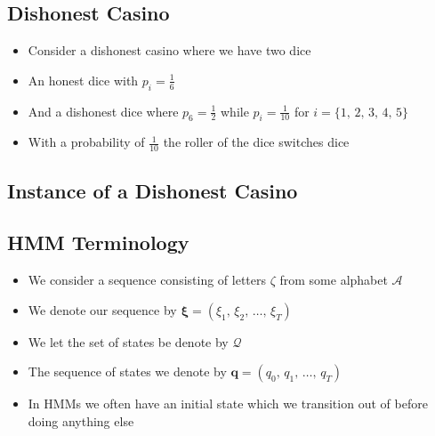 
\begin{slide}
\section{Dishonest Casino}

\begin{PauseHighLight}
  \begin{itemize}
  \item Consider a dishonest casino where we have two dice\pause
  \item An honest dice with $p_i=\tfrac{1}{6}$\pause
  \item And a dishonest dice where $p_6=\tfrac{1}{2}$ while
    $p_i=\tfrac{1}{10}$ for $i=\{1,\,2,\,3,\,4,\,5\}$\pause
  \item With a probability of $\tfrac{1}{10}$ the roller of the dice
    switches dice\pause
  \end{itemize}
\end{PauseHighLight}

\end{slide}


\begin{slide}
\section{Instance of a Dishonest Casino}
\pause
{}
\pb
\begin{center}
  \pause
\end{center}
\end{slide}


\begin{slide}
\section{HMM Terminology}

\begin{PauseHighLight}
  \begin{itemize}
  \item We consider a sequence consisting of letters $\zeta$ from some
    alphabet $\mathcal{A}$\pause
  \item We denote our sequence by $\bm{\xi} = (\xi_1,\, \xi_2,\,
    \ldots,\, \xi_T)$\pause
  \item We let the set of states be denote by $\mathcal{Q}$\pause
  \item The sequence of states we denote by
    $\bm{q} = (q_0,\, q_1,\, \ldots,\, q_T)$\pause
  \item In HMMs we often have an initial state which we transition out
    of before doing anything else\pause
  \end{itemize}
\end{PauseHighLight}

\end{slide}


